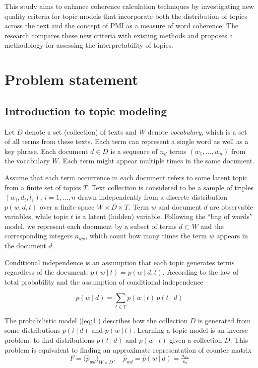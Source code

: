 \documentclass{article}
\begin{document}
This study aims to enhance coherence calculation techniques by investigating new quality criteria for topic models that incorporate both the distribution of topics across the text and the concept of PMI as a measure of word coherence.
The research compares these new criteria with existing methods and proposes a methodology for assessing the interpretability of topics.

\section{Problem statement}

\subsection{Introduction to topic modeling \cite{vorontsov2023BigARTM}}

Let $D$ denote a set (collection) of texts and $W$ denote \emph{vocabulary}, which is a set of all terms from these texts. 
Each term can represent a single word as well as a key phrase. 
Each document $d \in D$ is a sequence of $n_d$ terms $(w_1, \dots, w_n)$ from the vocabulary $W$. 
Each term might appear multiple times in the same document.

Assume that each term occurrence in each document refers to some latent topic from a finite set of topics $T$. 
Text collection is considered to be a sample of triples $(w_i,d_i,t_i),\, {i=1,\ldots ,n} $ drawn independently from a discrete distribution $p(w,d,t)$ over a finite space $W\times D \times T$. 
Term $w$ and document $d$ are observable variables, while topic $t$ is a latent (hidden) variable. 
Following the ``bag of words'' model, we represent each document by a subset of terms $d\subset W$ and the corresponding integers $n_{dw}$, which count how many times the term $w$ appears in the document $d$.

Conditional independence is an assumption that each topic generates terms regardless of the document: $p(w\ {\vert }\ t) = p(w\ {\vert }\ d,t)$. 
According to the law of total probability and the assumption of conditional independence

\begin{equation}
 \label{eq:1}
 p(w\ {\vert }\ d) = \sum _{t\in T} p(w\ {\vert }\ t)\, p(t\ {\vert }\ d)
\end{equation}

The probabilistic model (\ref{eq:1}) describes how the collection $D$ is generated from some distributions $p(t\ {\vert }\ d)$ and $p(w\ {\vert }\ t)$. 
Learning a topic model is an inverse problem: to find distributions $p(t\ {\vert }\ d)$ and $p(w\ {\vert }\ t)$ given a collection $D$.
This problem is equivalent to finding an approximate representation of counter matrix
\begin{equation}
F = \bigl ( \hat{p}_{wd} \bigr )_{W{\times }D}, \quad \hat{p}_{wd} = \hat{p}(w\ {\vert }\ d) = \tfrac{n_{dw}}{n_d}
\end{equation}
\end{document}
